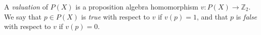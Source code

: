 A \emph{valuation} of $P(X)$ is a proposition algebra homomorphism $v: P(X) \to \mathbb{Z}_2$. We say that $p \in P(X)$ is \emph{true} with respect to $v$ if $v(p) = 1$, and that $p$ is \emph{false} with respect to $v$ if $v(p) = 0$.
